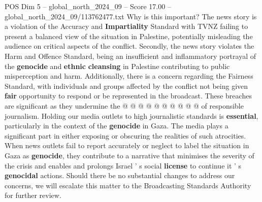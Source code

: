 \begin{textsample}{POS Dim 5 – global\_north\_2024\_09 – Score 17.00 – global\_north\_2024\_09/113762477.txt}
Why is this important?
The news story is a violation of the Accuracy and \textbf{Impartiality} Standard with TVNZ failing to present a balanced view of the situation in Palestine, potentially misleading the audience on critical aspects of the conflict.
Secondly, the news story violates the Harm and Offence Standard, being an insufficient and inflammatory portrayal of the \textbf{genocide} and \textbf{ethnic} \textbf{cleansing} in Palestine contributing to public misperception and harm.
Additionally, there is a concern regarding the Fairness Standard, with individuals and groups affected by the conflict not being given \textbf{fair} opportunity to respond or be represented in the broadcast.
These breaches are significant as they undermine the @ @ @ @ @ @ @ @ @ @ of responsible journalism.
Holding our media outlets to high journalistic standards is \textbf{essential}, particularly in the context of the \textbf{genocide} in Gaza.
The media plays a significant part in either exposing or obscuring the realities of such atrocities.
When news outlets fail to report accurately or neglect to label the situation in Gaza as \textbf{genocide}, they contribute to a narrative that minimises the severity of the crisis and enables and prolongs Israel ' s social \textbf{license} to continue it ' s \textbf{genocidal} actions.
Should there be no substantial changes to address our concerns, we will escalate this matter to the Broadcasting Standards Authority for further review.

\end{textsample}
